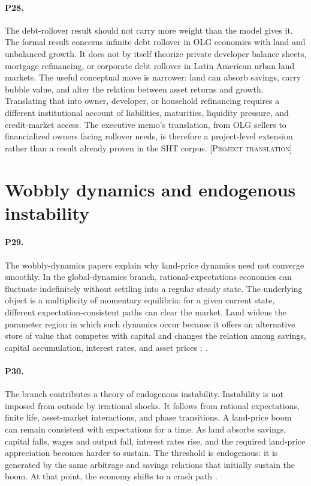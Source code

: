 \documentclass[11pt]{article}
\newcommand{\projecttranslation}{\textsc{[Project translation]}}
\begin{document}
\paragraph{P28.} The debt-rollover result should not carry more weight than the model gives it. The formal result concerns infinite debt rollover in OLG economies with land and unbalanced growth. It does not by itself theorize private developer balance sheets, mortgage refinancing, or corporate debt rollover in Latin American urban land markets. The useful conceptual move is narrower: land can absorb savings, carry bubble value, and alter the relation between asset returns and growth. Translating that into owner, developer, or household refinancing requires a different institutional account of liabilities, maturities, liquidity pressure, and credit-market access. The executive memo's translation, from OLG sellers to financialized owners facing rollover needs, is therefore a project-level extension rather than a result already proven in the SHT corpus. \projecttranslation{}

\section{Wobbly dynamics and endogenous instability}

\paragraph{P29.} The wobbly-dynamics papers explain why land-price dynamics need not converge smoothly. In the global-dynamics branch, rational-expectations economies can fluctuate indefinitely without settling into a regular steady state. The underlying object is a multiplicity of momentary equilibria: for a given current state, different expectation-consistent paths can clear the market. Land widens the parameter region in which such dynamics occur because it offers an alternative store of value that competes with capital and changes the relation among savings, capital accumulation, interest rates, and asset prices \citep[pp.~1--2, 10]{hiranoStiglitz2022WobblyEconomy}; \citep[pp.~7, 24, 46--47]{hiranoStiglitz2022LandSpeculation}.

\paragraph{P30.} The branch contributes a theory of endogenous instability. Instability is not imposed from outside by irrational shocks. It follows from rational expectations, finite life, asset-market interactions, and phase transitions. A land-price boom can remain consistent with expectations for a time. As land absorbs savings, capital falls, wages and output fall, interest rates rise, and the required land-price appreciation becomes harder to sustain. The threshold is endogenous: it is generated by the same arbitrage and savings relations that initially sustain the boom. At that point, the economy shifts to a crash path \citep[pp.~7, 24, 46--47]{hiranoStiglitz2022LandSpeculation}.
\end{document}
